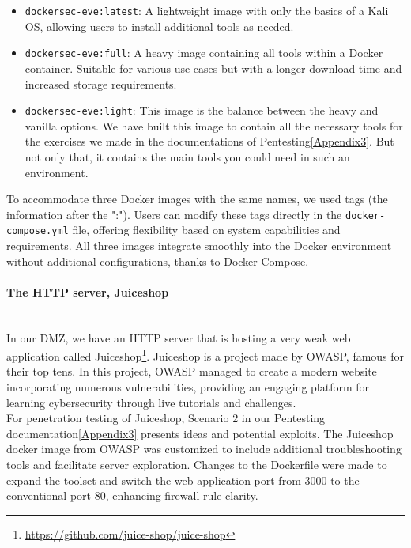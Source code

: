 \documentclass[a4paper,11pt,singlespacing]{article}
\begin{document}
\begin{itemize}
    \item \texttt{dockersec-eve:latest}: A lightweight image with only the basics of a Kali OS, allowing users to install additional tools as needed.
    \item \texttt{dockersec-eve:full}: A heavy image containing all tools within a Docker container. Suitable for various use cases but with a longer download time and increased storage requirements.
    \item \texttt{dockersec-eve:light}: This image is the balance between the heavy and vanilla options. We have built this image to contain all the necessary tools for the exercises we made in the documentations of Pentesting\ref{Appendix3}. But not only that, it contains the main tools you could need in such an environment.
\end{itemize}

To accommodate three Docker images with the same names, we used tags (the information after the ":"). Users can modify these tags directly in the \texttt{docker-compose.yml} file, offering flexibility based on system capabilities and requirements. All three images integrate smoothly into the Docker environment without additional configurations, thanks to Docker Compose.

\paragraph{The HTTP server, Juiceshop}
\leavevmode\\
In our DMZ, we have an HTTP server that is hosting a very weak web application called Juiceshop\footnote{\url{https://github.com/juice-shop/juice-shop}}. Juiceshop is a project made by OWASP, famous for their top tens. In this project, OWASP managed to create a modern website incorporating numerous vulnerabilities, providing an engaging platform for learning cybersecurity through live tutorials and challenges.\\

For penetration testing of Juiceshop, Scenario 2 in our Pentesting documentation\ref{Appendix3} presents ideas and potential exploits. The Juiceshop docker image from OWASP was customized to include additional troubleshooting tools and facilitate server exploration. Changes to the Dockerfile were made to expand the toolset and switch the web application port from 3000 to the conventional port 80, enhancing firewall rule clarity.\\
\end{document}
